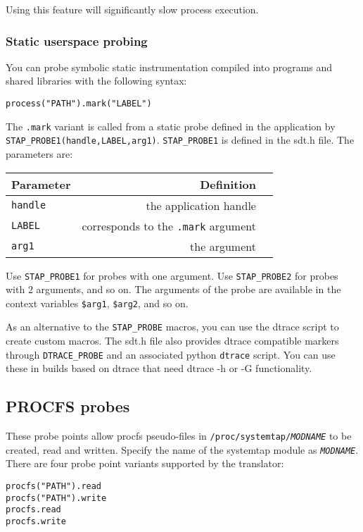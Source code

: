 \documentclass[twoside,english]{article}
\newenvironment{vindent}
{\begin{list}{}{\setlength{\listparindent}{6pt}}
\item[]}
{\end{list}}
\begin{document}
Using this feature will significantly slow process execution.

\subsubsection{Static userspace probing}
\label{sec:staticuserspace}
You can probe symbolic static instrumentation compiled into programs
and shared libraries with the following syntax:
\begin{vindent}
\begin{verbatim}
process("PATH").mark("LABEL")
\end{verbatim}
\end{vindent}

The \texttt{.mark} variant is called from a static probe defined in
the application by
\texttt{STAP\_PROBE1(handle,LABEL,arg1)}. \texttt{STAP\_PROBE1} is
defined in the sdt.h file.  The parameters are:


\begin{tabular}{|l|r|c|}
  Parameter & Definition \\ \hline
  \texttt{handle} & the application handle \\ \hline
  \texttt{LABEL} & corresponds to the \texttt{.mark} argument \\ \hline
  \texttt{arg1} & the argument \\ \hline
\end{tabular}


Use \texttt{STAP\_PROBE1} for probes with one argument.  Use
\texttt{STAP\_PROBE2} for probes with 2 arguments, and so on.  The
arguments of the probe are available in the context variables
\texttt{\$arg1}, \texttt{\$arg2}, and so on.

As an alternative to the \texttt{STAP\_PROBE} macros, you can use the
dtrace script to create custom macros. The sdt.h file also provides
dtrace compatible markers through \texttt{DTRACE\_PROBE} and an
associated python \texttt{dtrace} script.  You can use these in builds
based on dtrace that need dtrace -h or -G functionality.

\subsection{PROCFS probes}
These probe points allow procfs pseudo-files in
\texttt{/proc/systemtap/\textit{MODNAME}} to be created, read and
written.  Specify the name of the systemtap module as
\texttt{\textit{MODNAME}}.  There are four probe point variants
supported by the translator:
\begin{vindent}
\begin{verbatim}
procfs("PATH").read
procfs("PATH").write
procfs.read
procfs.write
\end{verbatim}
\end{vindent}
\end{document}
